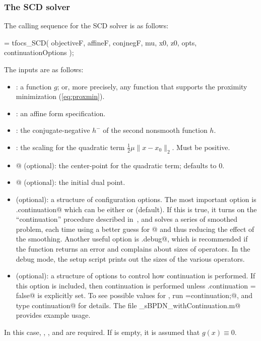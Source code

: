 \documentclass{article}
\newcommand\thalf{{\textstyle\frac{1}{2}}}
\newcommand{\<}{\langle}
\renewcommand{\>}{\rangle}
\begin{document}
\subsubsection{The SCD solver}

The calling sequence for the SCD solver is as follows:
\begin{code}
	[ x, out ] = tfocs_SCD( objectiveF, affineF, conjnegF, mu, x0, z0, opts, continuationOptions );
\end{code}
The inputs are as follows:
\begin{itemize}
\item \verb@objectiveF@: a function $g$; 
or, more precisely, any
function that supports the proximity minimization (\ref{eq:proxmin}).
\item \verb@affineF@: an affine form specification.
\item \verb@conjnegF@: the conjugate-negative $h^{-}$ of the second nonsmooth function $h$.
\item \verb@mu@: the scaling for the quadratic term $\thalf\mu\|x-x_0\|_2$. Must be positive.
\item {}@ (optional): the center-point for the quadratic term; defaults to 0.
\item {}@ (optional): the initial dual point.
\item \verb@opts@ (optional): a structure of configuration options.
    The most important option is \verb@opts.continuation@ which can be either \verb@true@ or \verb@false@ (default).
    If this is true, it turns on the ``continuation'' procedure described in~\cite{TFOCS}, and solves
    a series of smoothed problem, each time using a better guess for @ and thus reducing the effect
    of the smoothing. Another useful option is \verb@opts.debug@, which is recommended if the function returns an error and complains about sizes of operators. In the debug mode, the setup script prints out the sizes of the various operators.
\item \verb@continuationOpts@ (optional): a structure of options to control how continuation is performed.
    If this option is included, then continuation is performed unless \verb@opts.continuation = false@ is explicitly
    set. To see possible values for \verb@continuationOpts@, run \verb@continuationOpts=continuation;@,
    and type \verb@help continuation@ for details.
    The file \verb@examples\smallscale\test_sBPDN_withContinuation.m@ provides example usage.
\end{itemize}
In this case, \verb@affineF@, \verb@conjnegF@, and \verb@mu@ are required.
If \verb@objectiveF@ is empty, it is assumed that $g(x)\equiv 0$. 
\end{document}
